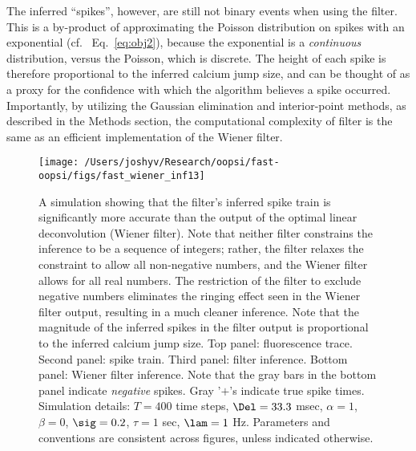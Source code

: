 
The inferred ``spikes'', however, are still not binary events when using the \foopsi filter.  This is a by-product of approximating the Poisson distribution on spikes with an exponential (cf.~ Eq.~\eqref{eq:obj2}), because the exponential is a \emph{continuous} distribution, versus the Poisson, which is discrete.  The height of each spike is therefore proportional to the inferred calcium jump size, and can be thought of as a proxy for the confidence with which the algorithm believes a spike occurred.   Importantly, by utilizing the Gaussian elimination and interior-point methods, as described in the Methods section, the computational complexity of \foopsi filter is the same as an efficient implementation of the Wiener filter.  



\begin{figure}[h!]
\centering \texttt{[image: /Users/joshyv/Research/oopsi/fast-oopsi/figs/fast\_wiener\_inf13]}
\caption[\foopsi filter outperforms Wiener filter]{A simulation showing that the \foopsi filter's inferred spike train is significantly more accurate than the output of the optimal linear deconvolution (Wiener filter). Note that neither filter constrains the inference to be a sequence of integers; rather, the \foopsi filter relaxes the constraint to allow all non-negative numbers, and the Wiener filter allows for all real numbers.  The restriction of the \foopsi filter to exclude negative numbers eliminates the ringing effect seen in the Wiener filter output, resulting in a much cleaner inference.  Note that the magnitude of the inferred spikes in the \foopsi filter output is proportional to the inferred calcium jump size.  Top panel: fluorescence trace.  Second panel: spike train.  Third panel: \foopsi filter inference.  Bottom panel: Wiener filter inference.  Note that the gray bars in the bottom panel indicate \emph{negative} spikes. Gray '$+$'s indicate true spike times.  Simulation details: $T= 400$ time steps, $\Del=33.3$ msec, $\alpha=1$, $\beta=0$, $\sig=0.2$, $\tau=1$ sec, $\lam=1$ Hz. Parameters and conventions are consistent across figures, unless indicated otherwise.} \label{fig:woopsi_inf}
\end{figure}


